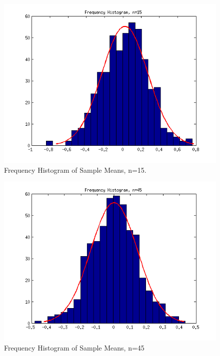 \documentclass[12pt,a4paper]{article}
\begin{document}
\begin{figure}[ht!]
\begin{center}
\includegraphics[scale=.70]{q3pt1_hist_15.png}
\caption{Frequency Histogram of Sample Means, n=15.}
\label{q3pt1fig4}
\end{center}
\end{figure}
\FloatBarrier

\begin{figure}[ht!]
\begin{center}
\includegraphics[scale=.70]{q3pt1_hist_45.png}
\caption{Frequency Histogram of Sample Means, n=45}
\label{q3pt1fig5}
\end{center}
\end{figure}
\FloatBarrier
\end{document}
